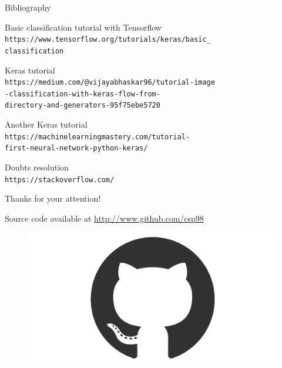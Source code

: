 \documentclass{beamer}
\begin{document}
\begin{frame}[allowframebreaks]{Bibliography}
\begin{thebibliography}{8}
   Basic classification tutorial with Tensorflow
   \\\texttt{https://www.tensorflow.org/tutorials/keras/basic\_\\classification}


   Keras tutorial
   \\\texttt{https://medium.com/@vijayabhaskar96/tutorial-image\\-classification-with-keras-flow-from-\\directory-and-generators-95f75ebe5720}

   Another Keras tutorial
   \\\texttt{https://machinelearningmastery.com/tutorial-\\first-neural-network-python-keras/}

   Doubts resolution
   \\\texttt{https://stackoverflow.com/}

  \end{thebibliography}

\end{frame}

\begin{frame}[fragile]
 \begin{center}
  \Huge
  Thanks for your attention!
 \end{center}
 \vspace{2cm}
 Source code available at \textcolor{blue}{\url{http://www.github.com/csp98}}
 \vspace{1cm}
 \begin{figure}[H]
  \centering
  \includegraphics[scale=0.05]{github-mark.png}
 \end{figure}

\end{frame}
\end{document}
